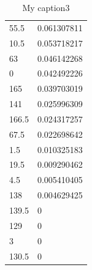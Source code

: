 \begin{longtable}{|l|l|}
 \rowcolor[HTML]{32CB00} 
 55.5                                                    & 0.061307811                                                   \\
 \rowcolor[HTML]{32CB00} 
 10.5                                                    & 0.053718217                                                   \\
 \rowcolor[HTML]{32CB00} 
 63                                                      & 0.046142268                                                   \\
 \rowcolor[HTML]{32CB00} 
 0                                                       & 0.042492226                                                   \\
 \rowcolor[HTML]{32CB00} 
 165                                                     & 0.039703019                                                   \\
 \rowcolor[HTML]{32CB00} 
 141                                                     & 0.025996309                                                   \\
 \rowcolor[HTML]{32CB00} 
 166.5                                                   & 0.024317257                                                   \\
 \rowcolor[HTML]{32CB00} 
 67.5                                                    & 0.022698642                                                   \\
 \rowcolor[HTML]{32CB00} 
 1.5                                                     & 0.010325183                                                   \\
 \rowcolor[HTML]{32CB00} 
 19.5                                                    & 0.009290462                                                   \\
 \rowcolor[HTML]{32CB00} 
 4.5                                                     & 0.005410405                                                   \\
 \rowcolor[HTML]{32CB00} 
 138                                                     & 0.004629425                                                   \\
 \rowcolor[HTML]{32CB00} 
 139.5                                                   & 0                                                             \\
 \rowcolor[HTML]{32CB00} 
 129                                                     & 0                                                             \\
 \rowcolor[HTML]{32CB00} 
 3                                                       & 0                                                             \\
 \rowcolor[HTML]{32CB00} 130.5           & 0  \hline 
	\caption{My caption3}
	\label{my-label2}
\end{longtable}

